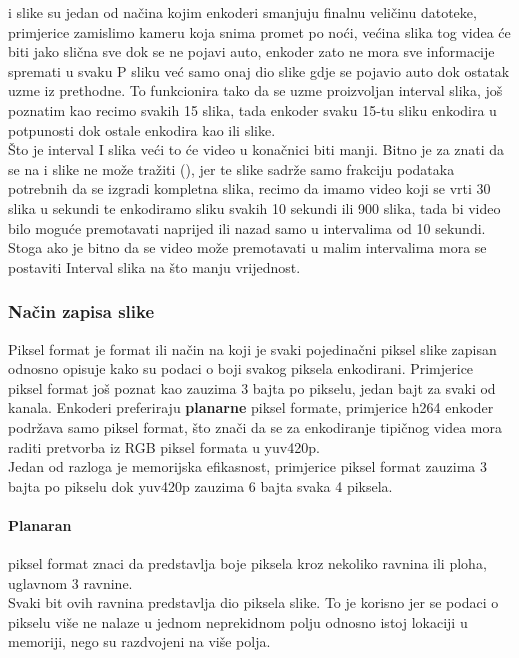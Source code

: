  i  slike su jedan od načina kojim enkoderi smanjuju finalnu veličinu datoteke, 
primjerice zamislimo kameru koja snima promet po noći,
većina slika tog videa će biti jako slična sve dok se ne pojavi auto, enkoder zato ne mora sve informacije spremati u svaku P sliku
već samo onaj dio slike gdje se pojavio auto dok ostatak uzme iz prethodne.
\paraBreak
To funkcionira tako da se uzme proizvoljan interval  slika, još poznatim kao  recimo 
svakih 15 slika, tada enkoder svaku 15-tu sliku enkodira u potpunosti dok ostale enkodira kao  ili  slike.
\\
Što je interval I slika veći to će video u konačnici biti manji.
\paraBreak
Bitno je za znati da se na  i  slike ne može tražiti (), jer te slike sadrže samo frakciju podataka potrebnih
da se izgradi kompletna slika, recimo da imamo video koji se vrti 30 slika u sekundi te enkodiramo  sliku 
svakih 10 sekundi ili 900 slika, tada bi video bilo moguće premotavati naprijed ili nazad samo u intervalima od 10 sekundi.
\paraBreak
Stoga ako je bitno da se video može premotavati u malim intervalima mora se postaviti Interval  
slika na što manju vrijednost.

\subsubsection{Način zapisa slike} \label{sec:pixelformat}
Piksel format je format ili način na koji je svaki pojedinačni piksel slike zapisan odnosno opisuje kako su podaci o boji
svakog piksela enkodirani. Primjerice piksel format  još poznat kao  
zauzima 3 bajta po pikselu, jedan bajt za svaki od kanala.
\paraBreak
Enkoderi preferiraju \textbf{planarne} piksel formate, primjerice h264 enkoder podržava samo  piksel format, što
znači da se za enkodiranje tipičnog videa mora raditi pretvorba iz RGB piksel formata u yuv420p. \\
Jedan od razloga je memorijska efikasnost, primjerice  piksel format zauzima 3 bajta po pikselu dok
yuv420p zauzima 6 bajta svaka 4 piksela. \cite{ffmpegBook}

\paragraph{Planaran} \label{sec:planar} piksel format znaci da predstavlja boje piksela kroz nekoliko ravnina ili 
ploha, uglavnom 3 ravnine. \\
Svaki bit ovih ravnina predstavlja dio piksela slike. To je korisno jer se podaci o pikselu više ne nalaze u jednom 
neprekidnom polju odnosno istoj lokaciji u memoriji, nego su razdvojeni na više polja.

